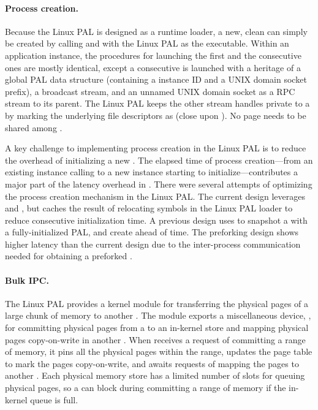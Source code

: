 \paragraph{Process creation.}
Because the Linux PAL is designed as a runtime loader,
a new, clean \picoproc{} can simply be created by calling  and  with the Linux PAL as the executable.
Within an application instance, the procedures for launching the first \picoproc{} and the consecutive ones
are mostly identical,
except a consecutive \picoproc{} is launched with a heritage of a global PAL data structure (containing a \graphene{} instance ID and a UNIX domain socket prefix), a broadcast stream,
and an unnamed UNIX domain socket as a RPC stream to its parent.
The Linux PAL keeps the other stream handles private to a \picoproc{}
by marking the underlying file descriptors
as  (close upon ).
No page needs to be shared among \picoprocs{}.


A key challenge to implementing process creation in the Linux PAL
is to reduce the overhead
of initializing a new \picoproc{}.
The elapsed time of process creation---from an existing \thelibos{} instance calling  to a new \thelibos{} instance starting to initialize---contributes a major part of the  latency overhead
in \graphene{}.
There were several attempts of optimizing the process creation mechanism
in the Linux PAL.
The current design leverages  and ,
but caches the result of relocating symbols in the Linux PAL loader to reduce consecutive \picoproc{} initialization time.
A previous design
uses  to snapshot a \picoproc{} with a fully-initialized PAL,
and create \picoprocs{} ahead of time.
The preforking design shows higher latency than the current design
due to the inter-process communication needed for obtaining a preforked \picoproc{}.




\paragraph{Bulk IPC.}
The Linux PAL provides a  kernel module for
transferring the physical pages of a large chunk of memory to another \picoproc{}. 
The  module exports a miscellaneous device, , for committing physical pages from a \picoproc{} to an in-kernel store and mapping physical pages copy-on-write in another \picoproc{}.
When  receives
a request of committing a range of memory, it pins all the physical pages within the range,
updates the page table to mark the pages copy-on-write,
and awaits requests of mapping the pages to another \picoproc{}.
Each physical memory store has a limited number of slots for queuing physical pages,
so a \picoproc{} can block during committing a range of memory
if the in-kernel queue is full.





